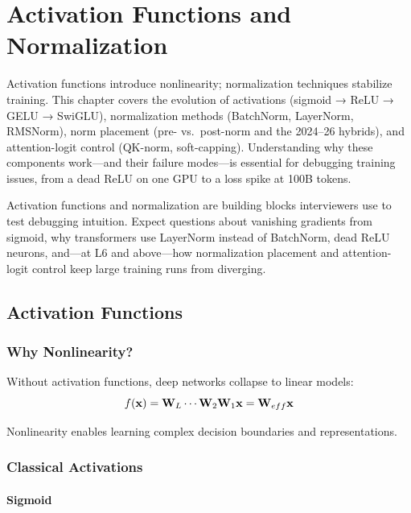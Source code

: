 \chapter{Activation Functions and Normalization}
\label{chap:activation_normalization}

\begin{tldr}
Activation functions introduce nonlinearity; normalization techniques stabilize training. This chapter covers the evolution of activations (sigmoid → ReLU → GELU → SwiGLU), normalization methods (BatchNorm, LayerNorm, RMSNorm), norm placement (pre- vs.\ post-norm and the 2024--26 hybrids), and attention-logit control (QK-norm, soft-capping). Understanding why these components work—and their failure modes—is essential for debugging training issues, from a dead ReLU on one GPU to a loss spike at 100B tokens.
\end{tldr}

Activation functions and normalization are building blocks interviewers use to test debugging intuition. Expect questions about vanishing gradients from sigmoid, why transformers use LayerNorm instead of BatchNorm, dead ReLU neurons, and—at L6 and above—how normalization placement and attention-logit control keep large training runs from diverging.

\section{Activation Functions}
\label{sec:activations}

\subsection{Why Nonlinearity?}

Without activation functions, deep networks collapse to linear models:
\begin{equation}
f(\mathbf{x}) = \mathbf{W}_L \cdots \mathbf{W}_2 \mathbf{W}_1 \mathbf{x} = \mathbf{W}_{eff} \mathbf{x}
\end{equation}

Nonlinearity enables learning complex decision boundaries and representations.

\subsection{Classical Activations}

\subsubsection{Sigmoid}

